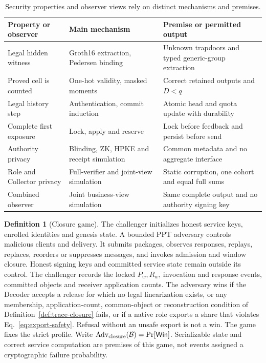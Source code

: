\documentclass[conference,compsoc]{IEEEtran}
\theoremstyle{definition}
\newtheorem{definition}{Definition}[section]
\newtheorem{definition}{Definition}
\numberwithin{equation}{section}
\numberwithin{table}{section}
\numberwithin{figure}{section}
\theoremstyle{plain}
\begin{document}
\begin{table}[t]
\centering
\caption{Security properties and observer views rely on distinct mechanisms and premises.}
\label{tab:assumption-map}
\label{tab:privacy-domain}
\footnotesize
\begin{tabularx}{\columnwidth}{@{}YYY@{}}
\toprule
Property or observer & Main mechanism & Premise or permitted output \\
\midrule
Legal hidden witness & Groth16 extraction, Pedersen binding & Unknown trapdoors and typed generic-group extraction \\
Proved cell is counted & One-hot validity, masked moments & Correct retained outputs and \(D<q\) \\
Legal history step & Authentication, commit induction & Atomic head and quota update with durability \\
Complete first exposure & Lock, apply and reserve & Lock before feedback and persist before send \\
Authority privacy & Blinding, ZK, HPKE and receipt simulation & Common metadata and no aggregate interface \\
Role and Collector privacy & Full-verifier and joint-view simulation & Static corruption, one cohort and equal full sums \\
Combined observer & Joint business-view simulation & Same complete output and no authority signing key \\
\bottomrule
\end{tabularx}
\end{table}

\begin{definition}[Closure game]
\label{game:closure}
The challenger initializes honest service keys, enrolled identities and genesis
state. A bounded PPT adversary controls malicious clients and delivery. It
submits packages, observes responses, replays, replaces, reorders or suppresses
messages, and invokes admission and window closure. Honest signing keys and
committed service state remain outside its control. The challenger records the
locked \(P_w,R_w\), invocation and response events, committed objects and
receiver application counts. The
adversary wins if the Decoder accepts a release for which no legal
linearization exists, or any membership, application-count, common-object
or reconstruction condition of Definition~\ref{def:trace-closure} fails,
or if a
native role exports a share that violates Eq.~\eqref{eq:export-safety}.
Refusal without an unsafe export is not a win. The game fixes the strict
profile. Write
\(\operatorname{Adv}_{\rm closure}(\mathcal B)=\Pr[\mathsf{Win}]\).
Serializable state and correct service computation are premises of this game,
not events assigned a cryptographic failure probability.
\end{definition}
\end{document}
